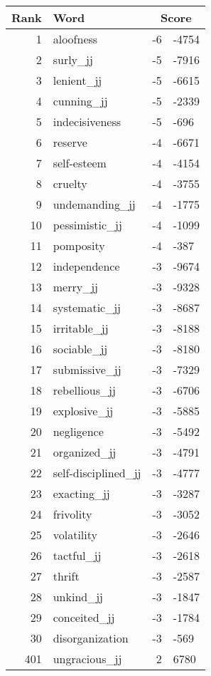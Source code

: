 \begin{longtable}[!htbp]{| rlr@{.}l |}
    \hline
    \textbf{Rank} & \textbf{Word} & \multicolumn{2}{c|}{\textbf{Score}} \\
    \hline
    \endhead
    1 & aloofness & -6 & -4754 \\
    2 & surly\_jj & -5 & -7916 \\
    3 & lenient\_jj & -5 & -6615 \\
    4 & cunning\_jj & -5 & -2339 \\
    5 & indecisiveness & -5 & -696 \\
    6 & reserve & -4 & -6671 \\
    7 & self-esteem & -4 & -4154 \\
    8 & cruelty & -4 & -3755 \\
    9 & undemanding\_jj & -4 & -1775 \\
    10 & pessimistic\_jj & -4 & -1099 \\
    11 & pomposity & -4 & -387 \\
    12 & independence & -3 & -9674 \\
    13 & merry\_jj & -3 & -9328 \\
    14 & systematic\_jj & -3 & -8687 \\
    15 & irritable\_jj & -3 & -8188 \\
    16 & sociable\_jj & -3 & -8180 \\
    17 & submissive\_jj & -3 & -7329 \\
    18 & rebellious\_jj & -3 & -6706 \\
    19 & explosive\_jj & -3 & -5885 \\
    20 & negligence & -3 & -5492 \\
    21 & organized\_jj & -3 & -4791 \\
    22 & self-disciplined\_jj & -3 & -4777 \\
    23 & exacting\_jj & -3 & -3287 \\
    24 & frivolity & -3 & -3052 \\
    25 & volatility & -3 & -2646 \\
    26 & tactful\_jj & -3 & -2618 \\
    27 & thrift & -3 & -2587 \\
    28 & unkind\_jj & -3 & -1847 \\
    29 & conceited\_jj & -3 & -1784 \\
    30 & disorganization & -3 & -569 \\
    401 & ungracious\_jj & 2 & 6780 \\

\end{longtable}
